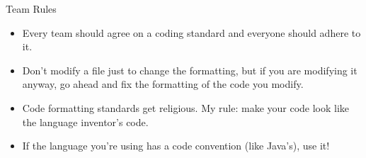 \documentclass{beamer}
\begin{document}
\begin{frame}[fragile]{Team Rules}

\begin{itemize}
\item Every team should agree on a coding standard and everyone should adhere to it.
\item Don't modify a file just to change the formatting, but if you are modifying it anyway, go ahead and fix the formatting of the code you modify.
\item Code formatting standards get religious.  My rule: make your code look like the language inventor's code.
\item If the language you're using has a code convention (like Java's), use it!
\end{itemize}


\end{frame}








\end{document}
